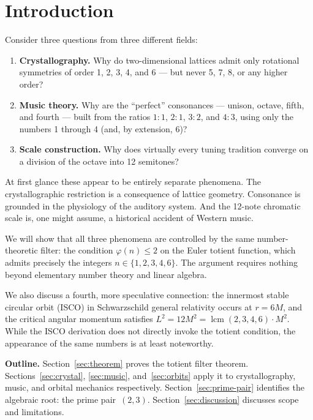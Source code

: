 \documentclass[preprint]{revtex4-2}
\DeclareMathOperator{\lcm}{lcm}
\begin{document}
\section{Introduction}

Consider three questions from three different fields:

\begin{enumerate}
\item \textbf{Crystallography.} Why do two-dimensional lattices admit only rotational symmetries of order 1, 2, 3, 4, and 6 --- but never 5, 7, 8, or any higher order?

\item \textbf{Music theory.} Why are the ``perfect'' consonances --- unison, octave, fifth, and fourth --- built from the ratios $1{:}1$, $2{:}1$, $3{:}2$, and $4{:}3$, using only the numbers 1 through 4 (and, by extension, 6)?

\item \textbf{Scale construction.} Why does virtually every tuning tradition converge on a division of the octave into 12 semitones?
\end{enumerate}

At first glance these appear to be entirely separate phenomena. The crystallographic restriction is a consequence of lattice geometry. Consonance is grounded in the physiology of the auditory system. And the 12-note chromatic scale is, one might assume, a historical accident of Western music.

We will show that all three phenomena are controlled by the same number-theoretic filter: the condition $\varphi(n) \leq 2$ on the Euler totient function, which admits precisely the integers $n \in \{1, 2, 3, 4, 6\}$. The argument requires nothing beyond elementary number theory and linear algebra.

We also discuss a fourth, more speculative connection: the innermost stable circular orbit (ISCO) in Schwarzschild general relativity occurs at $r = 6M$, and the critical angular momentum satisfies $L^2 = 12M^2 = \lcm(2,3,4,6) \cdot M^2$. While the ISCO derivation does not directly invoke the totient condition, the appearance of the same numbers is at least noteworthy.

\textbf{Outline.} Section~\ref{sec:theorem} proves the totient filter theorem. Sections~\ref{sec:crystal}, \ref{sec:music}, and~\ref{sec:orbits} apply it to crystallography, music, and orbital mechanics respectively. Section~\ref{sec:prime-pair} identifies the algebraic root: the prime pair~$(2,3)$. Section~\ref{sec:discussion} discusses scope and limitations.
\end{document}
